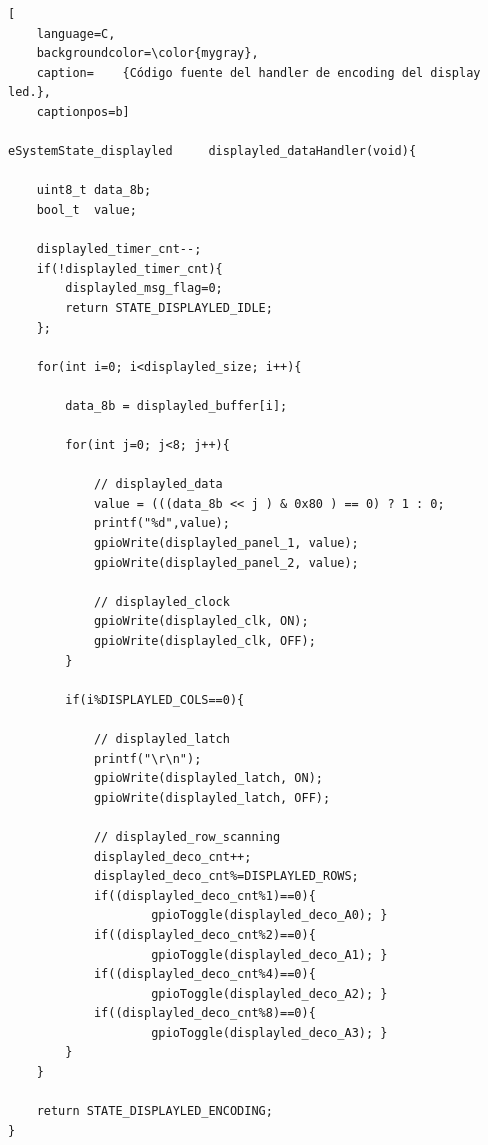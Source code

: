\begin{lstlisting}[
	language=C, 
	backgroundcolor=\color{mygray},
	caption=	{Código fuente del handler de encoding del display led.},
	captionpos=b]
	
eSystemState_displayled     displayled_dataHandler(void){

    uint8_t data_8b;
    bool_t  value;

    displayled_timer_cnt--;
    if(!displayled_timer_cnt){
        displayled_msg_flag=0;
        return STATE_DISPLAYLED_IDLE;
    };    

    for(int i=0; i<displayled_size; i++){
        
        data_8b = displayled_buffer[i];
        
        for(int j=0; j<8; j++){
            
            // displayled_data 
            value = (((data_8b << j ) & 0x80 ) == 0) ? 1 : 0;
            printf("%d",value);
            gpioWrite(displayled_panel_1, value);
            gpioWrite(displayled_panel_2, value);
            
            // displayled_clock 
            gpioWrite(displayled_clk, ON);
            gpioWrite(displayled_clk, OFF);
        }
        
        if(i%DISPLAYLED_COLS==0){

            // displayled_latch 
            printf("\r\n");
            gpioWrite(displayled_latch, ON);
            gpioWrite(displayled_latch, OFF);
            
            // displayled_row_scanning
            displayled_deco_cnt++;
            displayled_deco_cnt%=DISPLAYLED_ROWS;
            if((displayled_deco_cnt%1)==0){ 
            		gpioToggle(displayled_deco_A0); }
            if((displayled_deco_cnt%2)==0){ 
            		gpioToggle(displayled_deco_A1); }
            if((displayled_deco_cnt%4)==0){ 
            		gpioToggle(displayled_deco_A2); }
            if((displayled_deco_cnt%8)==0){ 
            		gpioToggle(displayled_deco_A3); }
        }
    }
    
    return STATE_DISPLAYLED_ENCODING;
}

\end{lstlisting}
